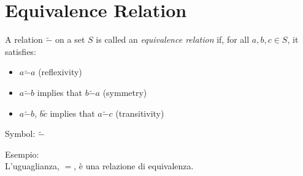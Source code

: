 \chapter{Equivalence Relation}

\begin{definizione}
A relation $\tilde{-}$ on a set $S$ is called an \textit{equivalence relation} if, for all $a, b, c \in S$, it satisfies:
\begin{itemize}
 \item $a \tilde{-} a$ (reflexivity)
 \item $a \tilde{-} b$ implies that $b \tilde{-} a$ (symmetry)
 \item $a \tilde{-} b$, $b \tilde c$ implies that $a \tilde{-} c$ (transitivity)
\end{itemize}
\end{definizione}

Symbol: $\tilde{-}$

Esempio: \\
L'uguaglianza, $=$, è una relazione di equivalenza.



